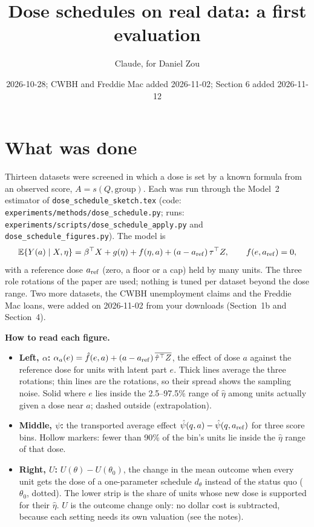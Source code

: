 \documentclass[10pt]{article}
\title{Dose schedules on real data: a first evaluation}
\author{Claude, for Daniel Zou}
\date{2026-10-28; CWBH and Freddie Mac added 2026-11-02; Section 6 added 2026-11-12}
\newcommand{\E}{\mathbb E}
\begin{document}
\maketitle
\sloppy

\section*{What was done}

Thirteen datasets were screened in which a dose is set by a known formula from an observed
score, $A=s(Q,\text{group})$. Each was run through the Model~2 estimator of
\texttt{dose\_schedule\_sketch.tex} (code: \texttt{experiments/methods/dose\_schedule.py};
runs: \texttt{experiments/scripts/dose\_schedule\_apply.py} and
\texttt{dose\_schedule\_figures.py}). The model is
\[
 \E\{Y(a)\mid X,\eta\}=\beta^\top X+g(\eta)+f(\eta,a)+(a-a_{\rm ref})\,\tau^\top Z,\qquad f(e,a_{\rm ref})=0,
\]
with a reference dose $a_{\rm ref}$ (zero, a floor or a cap) held by many units. The three role
rotations of the paper are used; nothing is tuned per dataset beyond the dose range.
Two more datasets, the CWBH unemployment claims and the Freddie Mac loans, were added on
2026-11-02 from your downloads (Section~1b and Section~4).

\textbf{How to read each figure.}
\begin{itemize}
\item \textbf{Left, $\alpha$:} $\alpha_a(e)=\hat f(e,a)+(a-a_{\rm ref})\,\overline{\hat\tau^\top Z}$,
 the effect of dose $a$ against the reference dose for units with latent part $e$. Thick
 lines average the three rotations; thin lines are the rotations, so their spread shows the
 sampling noise. Solid where $e$ lies inside the 2.5--97.5\% range of $\hat\eta$ among units
 actually given a dose near $a$; dashed outside (extrapolation).
\item \textbf{Middle, $\psi$:} the transported average effect
 $\hat\psi(q,a)-\hat\psi(q,a_{\rm ref})$ for three score bins. Hollow markers: fewer than
 90\% of the bin's units lie inside the $\hat\eta$ range of that dose.
\item \textbf{Right, $U$:} $U(\theta)-U(\theta_0)$, the change in the mean outcome when every
 unit gets the dose of a one-parameter schedule $d_\theta$ instead of the status quo
 ($\theta_0$, dotted). The lower strip is the share of units whose new dose is supported for
 their $\hat\eta$. $U$ is the outcome change only: no dollar cost is subtracted, because each
 setting needs its own valuation (see the notes).
\end{itemize}
\end{document}
